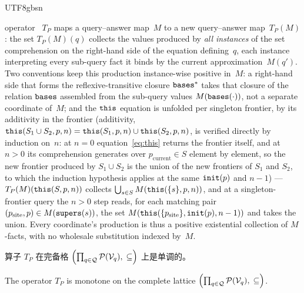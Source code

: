 \begin{CJK*}{UTF8}{gbsn}
\begin{definition}
{  operator}~\cite{vanemden1976-predicate-logic-semantics}
  $T_P$ maps a query--answer map~$M$ to a new
  query--answer map~$T_P(M)$: the set $T_P(M)(q)$ collects the
  values produced by \emph{all instances} of the set comprehension
  on the right-hand side of the equation defining~$q$, each instance
  interpreting every sub-query fact it binds by the current
  approximation~$M(q')$.
  Two conventions keep this production instance-wise positive
  in~$M$: a right-hand side that forms the reflexive-transitive
  closure $\mathtt{bases}^*$ takes that closure of the relation $\mathtt{bases}$
  assembled from the sub-query values $M(\mathtt{bases}(\cdot))$, not a
  separate coordinate of~$M$; and the $\mathtt{this}$ equation is unfolded
  per singleton frontier, by its additivity in the frontier
  (additivity,
  $\mathtt{this}(S_1 \cup S_2, p, n) = \mathtt{this}(S_1, p, n) \cup \mathtt{this}(S_2, p, n)$,
  is verified directly by induction on~$n$: at $n = 0$
  equation~\eqref{eq:this} returns the frontier itself, and at
  $n > 0$ its comprehension generates over
  $p_{\mathrm{current}} \in S$ element by element, so the new
  frontier produced by $S_1 \cup S_2$ is the union of the new
  frontiers of $S_1$ and $S_2$, to which the induction hypothesis
  applies at the same $\mathtt{init}(p)$ and $n-1$) ---
  $T_P(M)(\mathtt{this}(S, p, n))$ collects
  $\bigcup_{s \in S} M(\mathtt{this}(\{s\}, p, n))$, and at a
  singleton-frontier query the $n > 0$ step reads, for each matching
  pair $(p_{\mathrm{site}}, p) \in M(\mathtt{supers}(s))$, the set
  $M(\mathtt{this}(\{p_{\mathrm{site}}\}, \mathtt{init}(p), n-1))$ and takes the
  union. Every coordinate's production is thus a positive
  existential collection of $M$-facts, with no wholesale substitution
  indexed by~$M$.
\fi
\end{definition}

\begin{lemma}\label{lem:monotonicity}
  \ifPaperChinese
  算子 $T_P$ 在完备格
  $\Bigl(\prod_{q \in \mathcal{Q}} \mathcal{P}(\mathcal{V}_q),\; \subseteq\Bigr)$
  上是单调的。
  \else
  \begin{sloppypar}
  The operator $T_P$ is monotone on the complete lattice
  $\Bigl(\prod_{q \in \mathcal{Q}} \mathcal{P}(\mathcal{V}_q),\; \subseteq\Bigr)$.
  \end{sloppypar}
  \fi
\end{lemma}


\end{CJK*}
